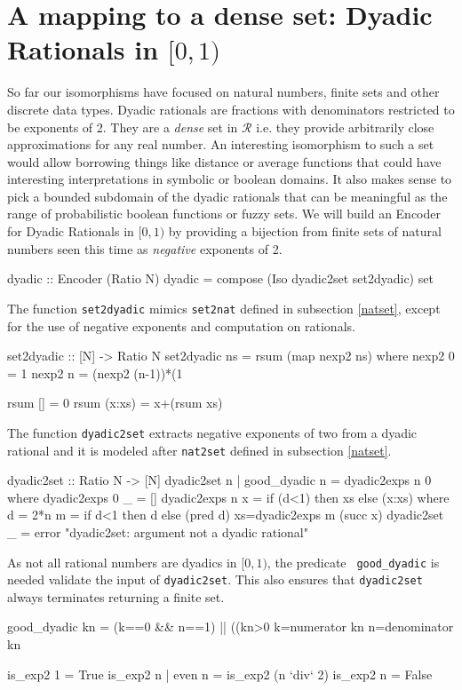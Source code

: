 \documentclass[]{INCLUDES/llncs}
\begin{document}
\section{A mapping to a dense set: Dyadic Rationals in $[0,1)$}
So far our isomorphisms have focused on natural numbers,
finite sets and other 
discrete data types.
Dyadic rationals are fractions with denominators 
restricted to be exponents of 2.
They are a {\em dense} set in $\mathcal{R}$ i.e. they provide arbitrarily
close approximations for any real number. An interesting isomorphism to
such a set would allow borrowing things like distance or average
functions that could have interesting interpretations in symbolic or boolean
domains. It also makes sense to pick a bounded subdomain of the dyadic
rationals that can be meaningful as the range of
probabilistic boolean functions or fuzzy sets.
We will build an Encoder for Dyadic Rationals in $[0,1)$ by
providing a bijection from finite sets of natural numbers
seen this time as {\em negative} exponents of 2.
\begin{code}
dyadic :: Encoder (Ratio N)
dyadic = compose (Iso dyadic2set set2dyadic) set
\end{code}
The function {\tt set2dyadic} mimics {\tt set2nat} defined in subsection
\ref{natset}, except for the use of negative exponents and computation on
rationals.
\begin{code}
set2dyadic :: [N] -> Ratio N
set2dyadic ns = rsum (map nexp2 ns) where
  nexp2 0 = 1%
  nexp2 n = (nexp2 (n-1))*(1%

  rsum [] = 0%
  rsum (x:xs) = x+(rsum xs)
\end{code}
The function {\tt dyadic2set} extracts negative exponents of two from
a dyadic rational and it is modeled after {\tt nat2set} defined in subsection
\ref{natset}.
\begin{code}
dyadic2set :: Ratio N -> [N]
dyadic2set n | good_dyadic n = dyadic2exps n 0 where
  dyadic2exps 0 _ = []
  dyadic2exps n x = 
    if (d<1) then xs else (x:xs) where
      d = 2*n
      m = if d<1 then d else (pred d)
      xs=dyadic2exps m (succ x)
dyadic2set _ =  
  error  "dyadic2set: argument not a dyadic rational"
\end{code}
As not all rational numbers are dyadics in $[0,1)$, the predicate {\tt
good\_dyadic} is needed validate the input of {\tt dyadic2set}. 
This also ensures that {\tt dyadic2set} always terminates returning
a finite set.
\begin{code}
good_dyadic kn = (k==0 && n==1) 
  || ((kn>0%
    k=numerator kn
    n=denominator kn

    is_exp2 1 = True
    is_exp2 n | even n = is_exp2 (n `div` 2)
    is_exp2 n = False
\end{code}
\end{document}
